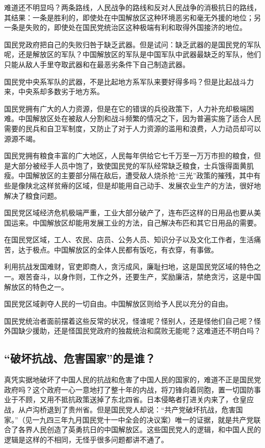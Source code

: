 难道还不明显吗？两条路线，人民战争的路线和反对人民战争的消极抗日的路线，其结果：一条是胜利的，即使处在中国解放区这种环境恶劣和毫无外援的地位；另一条是失败的，即使处在国民党统治区这种极端有利和取得外国接济的地位。

国民党政府把自己的失败归咎于缺乏武器。但是试问：缺乏武器的是国民党的军队呢，还是解放区的军队？中国解放区的军队是中国军队中武器最缺乏的军队，他们只能从敌人手里夺取武器和在最恶劣条件下自己制造武器。

国民党中央系军队的武器，不是比起地方系军队来要好得多吗？但是比起战斗力来，中央系却多数劣于地方系。

国民党拥有广大的人力资源，但是在它的错误的兵役政策下，人力补充却极端困难。中国解放区处在被敌人分割和战斗频繁的情况之下，因为普遍实施了适合人民需要的民兵和自卫军制度，又防止了对于人力资源的滥用和浪费，人力动员却可以源源不竭。

国民党拥有粮食丰富的广大地区，人民每年供给它七千万至一万万市担的粮食，但是大部分被经手人员中饱了，致使国民党的军队经常缺乏粮食，士兵饿得面黄肌瘦。中国解放区的主要部分隔在敌后，遭受敌人烧杀抢“三光”政策的摧残，其中有些是像陕北这样贫瘠的区域，但是却能用自己动手、发展农业生产的方法，很好地解决了粮食问题。

国民党区域经济危机极端严重，工业大部分破产了，连布匹这样的日用品也要从美国运来。中国解放区却能用发展工业的方法，自己解决布匹和其它日用品的需要。

在国民党区域，工人、农民、店员、公务人员、知识分子以及文化工作者，生活痛苦，达于极点。中国解放区的全体人民都有饭吃，有衣穿，有事做。

利用抗战发国难财，官吏即商人，贪污成风，廉耻扫地，这是国民党区域的特色之一。艰苦奋斗，以身作则，工作之外，还要生产，奖励廉洁，禁绝贪污，这是中国解放区的特色之一。

国民党区域剥夺人民的一切自由。中国解放区则给予人民以充分的自由。

国民党统治者面前摆着这些反常的状况，怪谁呢？怪别人，还是怪他们自己呢？怪外国缺少援助，还是怪国民党政府的独裁统治和腐败无能呢？这难道还不明白吗？

\subsection{“破坏抗战、危害国家”的是谁？}

真凭实据地破坏了中国人民的抗战和危害了中国人民的国家的，难道不正是国民党政府吗？这个政府一心一意地打了整十年的内战，将刀锋向着同胞，置一切国防事业于不顾，又用不抵抗政策送掉了东北四省。日本侵略者打进关内来了，仓皇应战，从卢沟桥退到了贵州省。但是国民党人却说：“共产党破坏抗战，危害国家。”（见一九四三年九月国民党十一中全会的决议案）唯一的证据，就是共产党联合了各界人民创造了英勇抗日的中国解放区。这些国民党人的逻辑，和中国人民的逻辑是这样的不相同，无怪乎很多问题都讲不通了。

